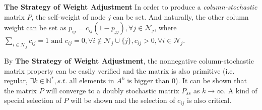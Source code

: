 	\textbf{The Strategy of Weight Adjustment} In order to produce a \emph{column-stochastic} matrix $P$, the self-weight of node $j$ can be set. And naturally, the other column weight can be set as $p_{ij}=c_{ij}(1-p_{jj}),\forall j\in \mathcal{N}_j$, where $\sum_{i\in\mathcal{N}_j}c_{ij}=1 \text{ and } c_{ij}=0,\forall i\notin\mathcal{N}_j\cup\{j\},c_{ij}>0,\forall i\in\mathcal{N}_j$. 
	
	By \textbf{The Strategy of Weight Adjustment}, the nonnegative column-stochastic matrix property can be easily verified and the matrix is also primitive (i.e. regular, $\exists k\in\mathbb{N}^*, s.t. \text{ all elements in }A^k \text{ is bigger than }0$). It can be shown that the matrix $P$ will converge to a doubly stochastic matrix $P_{ss}$ as $k\rightarrow \infty$. A kind of special selection of $P$ will be shown and the selection of $c_{ij}$ is also critical. 
	

